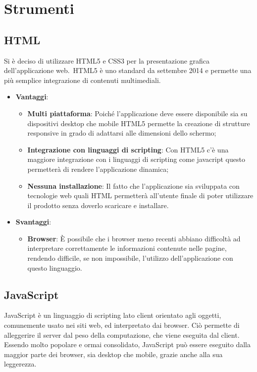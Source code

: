 \section{Strumenti}
	\subsection{HTML}{
		Si è deciso di utilizzare HTML5 e CSS3 per la presentazione grafica dell'applicazione web.\
		HTML5 è uno standard da settembre 2014 e permette una più semplice integrazione di contenuti multimediali.
	
		\begin{itemize}
			\item \textbf{Vantaggi}: 
			\begin{itemize}
				\item \textbf{Multi piattaforma}: Poiché l'applicazione deve essere disponibile sia su dispositivi desktop che mobile HTML5 permette la creazione di strutture responsive in grado di adattarsi alle dimensioni dello schermo;
				\item \textbf{Integrazione con linguaggi di scripting}: Con HTML5 c'è una maggiore integrazione con i linguaggi di scripting come javacript questo permetterà di rendere l'applicazione dinamica;
				\item \textbf{Nessuna installazione}: Il fatto che l'applicazione sia sviluppata con tecnologie web quali HTML permetterà all'utente finale di poter utilizzare il prodotto senza doverlo scaricare e installare.
			\end{itemize}
			\item \textbf{Svantaggi}:
			\begin{itemize}
				\item \textbf{Browser}: È possibile che i browser meno recenti abbiano difficoltà ad interpretare correttamente le informazioni contenute nelle pagine, rendendo difficile, se non impossibile, l'utilizzo dell'applicazione con questo linguaggio.
			\end{itemize}
		\end{itemize}
		}
	\subsection{JavaScript}{
		JavaScript è un linguaggio di scripting lato client orientato agli oggetti, comunemente usato nei siti web, ed interpretato dai browser. Ciò permette di alleggerire il server dal peso della computazione, che viene eseguita dal client. Essendo molto popolare e ormai consolidato, JavaScript può essere eseguito dalla maggior parte dei browser, sia desktop che mobile, grazie anche alla sua leggerezza. 		}
